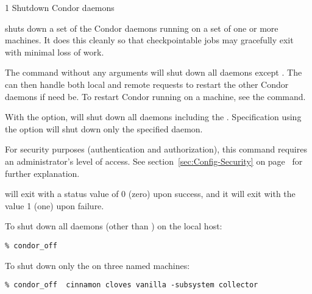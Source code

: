 \begin{ManPage}{\label{man-condor-off}}{1}
{Shutdown Condor daemons}
\Synopsis {}
\ToolArgsBase

\ToolDebugOption
\ToolArgsLocate
\ToolArgsAffect

\ToolDebugOption
\ToolWhere
\ToolArgsAffect


\Description 

 shuts down a set of the Condor daemons running on a set of
one or more machines.
It does this cleanly so that checkpointable jobs may gracefully exit with
minimal loss of work.

The command  without any arguments will shut down
all daemons except .
The  can then handle both local and remote
requests to restart the other Condor daemons if need be.  To restart
Condor running on a machine, see the  command.

With the  option,  will shut down
all daemons including the .
Specification using the  option
will shut down
only the specified daemon.

For security purposes (authentication and authorization),
this command requires an administrator's level of access.
See
section~\ref{sec:Config-Security} on page~\pageref{sec:Config-Security}
for further explanation.

\begin{Options}
	\ToolArgsBaseDesc
	\ToolDebugDesc
	\ToolArgsLocateDesc
	\ToolArgsAffectDesc
\end{Options}

\ExitStatus
{} will exit with a status value of 0 (zero) upon success,
and it will exit with the value 1 (one) upon failure.


\Examples
To shut down all daemons (other than ) on the
local host:
\begin{verbatim}
% condor_off
\end{verbatim}

To shut down only the  on three named machines:
\begin{verbatim}
% condor_off  cinnamon cloves vanilla -subsystem collector
\end{verbatim}


\end{ManPage}
